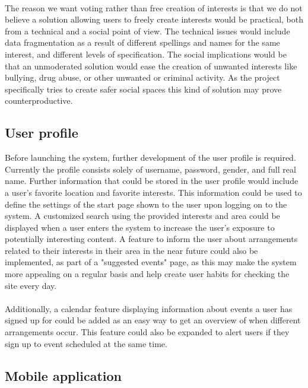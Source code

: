 \paragraph{} The reason we want voting rather than free creation of interests is that we do not believe a solution allowing users to freely create interests would be practical, both from a technical and a social point of view. The technical issues would include data fragmentation as a result of different spellings and names for the same interest, and different levels of specification. The social implications would be that an unmoderated solution  would ease the creation of unwanted interests like bullying, drug abuse, or other unwanted or criminal activity. As the project specifically tries to create safer social spaces this kind of solution may prove counterproductive.

\subsection{User profile}
\label{subsec:FurtherRequiredUser}

Before launching the system, further development of the user profile is required. Currently the profile consists solely of username, password, gender, and full real name. Further information that could be stored in the user profile would include a user's favorite location and favorite interests. This information could be used to define the settings of the start page shown to the user upon logging on to the system. A customized search using the provided interests and area could be displayed when a user enters the system to increase the user’s exposure to potentially interesting content. A feature to inform the user about arrangements related to their interests in their area in the near future could also be implemented, as part of a "suggested events" page, as this may make the system more appealing on a regular basis and help create user habits for checking the site every day.
\paragraph{} Additionally, a calendar feature displaying information about events a user has signed up for could be added as an easy way to get an overview of when different arrangements occur. This feature could also be expanded to alert users if they sign up to event scheduled at the same time.

\subsection{Mobile application}
\label{subsec:FurtherRequiredMobile}

